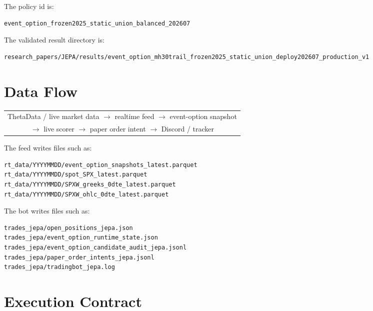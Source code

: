 \documentclass[11pt,a4paper]{article}
\begin{document}
The policy id is:

\begin{lstlisting}
event_option_frozen2025_static_union_balanced_202607
\end{lstlisting}

The validated result directory is:

\begin{lstlisting}
research_papers/JEPA/results/event_option_mh30trail_frozen2025_static_union_deploy202607_production_v1
\end{lstlisting}

\section{Data Flow}

\begin{center}
\begin{tabular}{c}
ThetaData / live market data $\rightarrow$ realtime feed $\rightarrow$ event-option snapshot \\
$\rightarrow$ live scorer $\rightarrow$ paper order intent $\rightarrow$ Discord / tracker
\end{tabular}
\end{center}

The feed writes files such as:

\begin{lstlisting}
rt_data/YYYYMMDD/event_option_snapshots_latest.parquet
rt_data/YYYYMMDD/spot_SPX_latest.parquet
rt_data/YYYYMMDD/SPXW_greeks_0dte_latest.parquet
rt_data/YYYYMMDD/SPXW_ohlc_0dte_latest.parquet
\end{lstlisting}

The bot writes files such as:

\begin{lstlisting}
trades_jepa/open_positions_jepa.json
trades_jepa/event_option_runtime_state.json
trades_jepa/event_option_candidate_audit_jepa.jsonl
trades_jepa/paper_order_intents_jepa.jsonl
trades_jepa/tradingbot_jepa.log
\end{lstlisting}

\section{Execution Contract}
\end{document}
